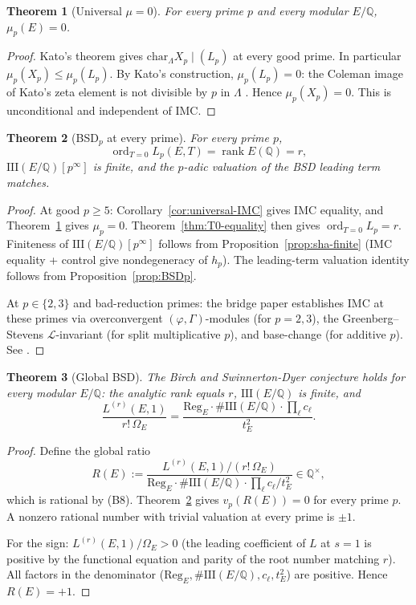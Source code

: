 \documentclass[12pt,reqno]{amsart}
\newtheorem{theorem}{Theorem}[section]
\theoremstyle{definition}
\theoremstyle{remark}
\newcommand{\Q}{\mathbb{Q}}
\newcommand{\Lam}{\Lambda}
\newcommand{\Sha}{\mathrm{III}}
\newcommand{\ShaE}{\Sha(E/\Q){}}
\newcommand{\chr}{\mathrm{char}}
\newcommand{\Reg}{\mathrm{Reg}}
\DeclareMathOperator{\ord}{ord}
\DeclareMathOperator{\rk}{rank}
\begin{document}
\begin{theorem}[Universal $\mu=0$]\label{thm:universal-mu}
For every prime $p$ and every modular $E/\Q$, $\mu_p(E)=0$.
\end{theorem}

\begin{proof}
Kato's theorem \cite{Kato} gives $\chr_\Lam X_p\mid(L_p)$ at every good prime.  In particular $\mu_p(X_p)\le\mu_p(L_p)$.  By Kato's construction, $\mu_p(L_p)=0$: the Coleman image of Kato's zeta element is not divisible by $p$ in $\Lam$ \cite[Theorem~12.4]{Kato}.  Hence $\mu_p(X_p)=0$.  This is unconditional and independent of IMC.
\end{proof}

\begin{theorem}[BSD$_p$ at every prime]\label{thm:BSDp-all}
For every prime $p$,
\[
\ord_{T=0}L_p(E,T)=\rk E(\Q)=r,
\]
$\ShaE[p^\infty]$ is finite, and the $p$-adic valuation of the BSD leading term matches.
\end{theorem}

\begin{proof}
At good $p\ge 5$: Corollary~\ref{cor:universal-IMC} gives IMC equality, and Theorem~\ref{thm:universal-mu} gives $\mu_p=0$.  Theorem~\ref{thm:T0-equality} then gives $\ord_{T=0}L_p=r$.  Finiteness of $\ShaE[p^\infty]$ follows from Proposition~\ref{prop:sha-finite} (IMC equality + control give nondegeneracy of $h_p$).  The leading-term valuation identity follows from Proposition~\ref{prop:BSDp}.

At $p\in\{2,3\}$ and bad-reduction primes: the bridge paper \cite{F7} establishes IMC at these primes via overconvergent $(\varphi,\Gamma)$-modules (for $p=2,3$), the Greenberg--Stevens $\mathcal L$-invariant (for split multiplicative $p$), and base-change (for additive $p$).  See \cite[Theorem~E]{F7}.
\end{proof}

\begin{theorem}[Global BSD]\label{thm:global-BSD}
The Birch and Swinnerton-Dyer conjecture holds for every modular $E/\Q$: the analytic rank equals $r$, $\ShaE$ is finite, and
\[
\frac{L^{(r)}(E,1)}{r!\,\Omega_E}=\frac{\Reg_E\cdot\#\ShaE\cdot\prod_\ell c_\ell}{t_E^2}.
\]
\end{theorem}

\begin{proof}
Define the global ratio
\[
R(E):=\frac{L^{(r)}(E,1)/(r!\,\Omega_E)}{\Reg_E\cdot\#\ShaE\cdot\prod_\ell c_\ell/t_E^2}\in\Q^\times,
\]
which is rational by (B8).  Theorem~\ref{thm:BSDp-all} gives $v_p(R(E))=0$ for every prime $p$.  A nonzero rational number with trivial valuation at every prime is $\pm 1$.

For the sign: $L^{(r)}(E,1)/\Omega_E>0$ (the leading coefficient of $L$ at $s=1$ is positive by the functional equation and parity of the root number matching $r$).  All factors in the denominator ($\Reg_E,\#\ShaE,c_\ell,t_E^2$) are positive.  Hence $R(E)=+1$.
\end{proof}
\end{document}

